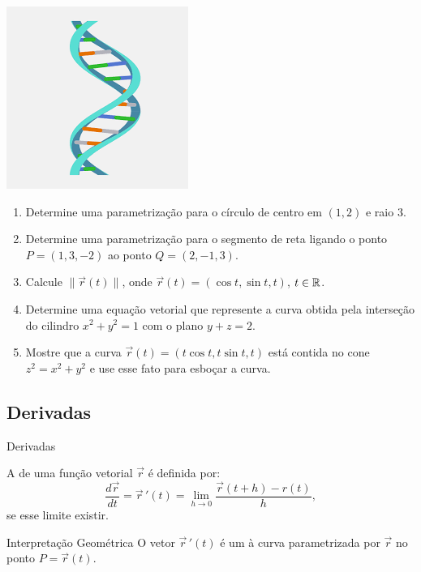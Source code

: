 \begin{frame}[label=fun-vet]
\begin{minipage}{0.35\textwidth}
\end{minipage}
\begin{minipage}{0.3\textwidth}
\includegraphics[scale=.4]{figuras/dna.png}
\end{minipage}

\end{frame}



\begin{frame}[label=fun-vet]
\begin{casa}
\begin{enumerate}
\item Determine uma parametrização para o círculo de centro em $(1,2)$ e raio $3$.
\item Determine uma parametrização para o segmento de reta ligando o ponto $P=(1,3,-2)$ ao ponto $Q=(2,-1,3)$.

\item Calcule $\|\vec{r}(t)\|$, onde $\vec{r}(t)=(\cos t,\sin t, t)$, $t\in \mathbb{R}$.

\item Determine uma equação vetorial que represente a curva obtida pela interseção do cilindro $x^2+y^2=1$ com o plano $y+z=2$.
\item Mostre que a curva $\vec{r}(t)=(t\cos t,t\sin t,t)$ está contida no cone $z^2=x^2+y^2$ e use esse fato para esboçar a curva.
\end{enumerate}
\end{casa}
\end{frame}

\subsection*{Derivadas}
\begin{frame}[label=fun-vet]{Derivadas}
\begin{defin}
A  de uma função vetorial $\vec{r}$ é definida por:
\[\frac{d\vec{r}}{dt}=\vec{r}\,'(t)=\lim\limits_{h\to 0}\frac{\vec{r}(t+h)-r(t)}{h},\]
se esse limite existir.
\end{defin}
\begin{block}{Interpretação Geométrica}
O vetor $\vec{r}\,'(t)$ é um  à curva parametrizada por $\vec{r}$ no ponto $P=\vec{r}(t)$.
\end{block}


\end{frame}


